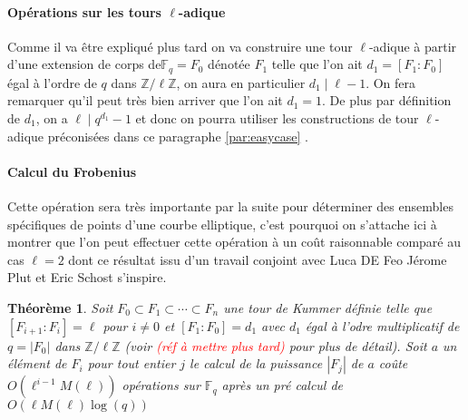 \documentclass[10pt,a4paper]{book}
\theoremstyle{plain}
\newtheorem{thm}{Théorème}
\theoremstyle{definition}
\theoremstyle{definition}
\theoremstyle{definition}
\theoremstyle{definition}
\theoremstyle{remark}
\theoremstyle{remark}
\begin{document}
\paragraph{Opérations sur les tours $\ell$-adique}
Comme il va être expliqué plus tard on va construire une tour $\ell$-adique à partir d'une extension de corps  de$\mathbb{F}_q=F_0$ dénotée $F_1$ telle que l'on ait $d_1=[F_1:F_0]$ égal à l'ordre de $q$ dans $\mathbb{Z}/\ell \mathbb{Z}$, on aura en particulier $d_1 \mid \ell-1$. On fera remarquer qu'il peut très bien arriver que l'on ait $d_1=1$. De plus par définition de $d_1$, on a $\ell \mid q^{d_1}-1$ et donc on pourra utiliser les constructions de tour $\ell$-adique préconisées dans ce paragraphe \ref{par:easycase} .%

\paragraph{Calcul du Frobenius}
Cette opération sera très importante par la suite pour déterminer des ensembles spécifiques de points d'une courbe elliptique, c'est pourquoi on s'attache ici à montrer que l'on peut effectuer cette opération à un coût raisonnable comparé au cas $\ell=2$ \cite{Doliskani-Schost15} dont ce résultat issu d'un travail conjoint avec Luca DE Feo Jérome Plut et Eric Schost s'inspire.

\begin{thm} \label{thm:frob-ell}
Soit $F_0 \subset F_1 \subset \cdots \subset F_n$ une tour de Kummer définie telle que $[F_{i+1}:F_i]=\ell$ pour $i \neq 0$ et $[F_1:F_0]=d_1$ avec $d_1$ égal à l'odre multiplicatif de $q=|F_0|$  dans $\mathbb{Z}/\ell \mathbb{Z}$ (voir \textcolor{red}{(réf à mettre plus tard)} pour plus de détail). Soit $a$ un élément de $F_i$ pour tout entier $j$ le calcul de la puissance $|F_j|$ de $a$ coûte $O(\ell^{i-1}M(\ell))$ opérations sur $\mathbb{F}_q$ après un pré calcul de $O(\ell M(\ell)\log(q))$
\end{thm} 
\end{document}
